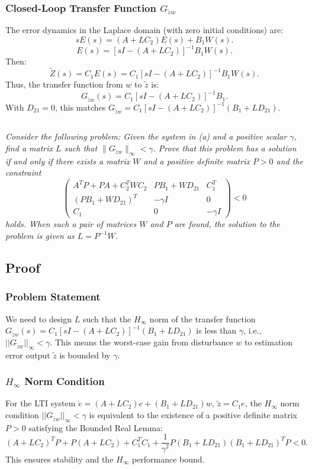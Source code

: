 \documentclass[12pt, letterpaper]{article}
\begin{document}
\subsubsection*{Closed-Loop Transfer Function \( G_{\tilde{z}w} \)}
The error dynamics in the Laplace domain (with zero initial conditions) are:
\[
sE(s) = (A + LC_2)E(s) + B_1W(s).
\]
\[
E(s) = [sI - (A + LC_2)]^{-1}B_1W(s).
\]
Then:
\[
\tilde{Z}(s) = C_1E(s) = C_1[sI - (A + LC_2)]^{-1}B_1W(s).
\]
Thus, the transfer function from \( w \) to \( \tilde{z} \) is:
\[
G_{\tilde{z}w}(s) = C_1[sI - (A + LC_2)]^{-1}B_1.
\]
With \( D_{21} = 0 \), this matches \( G_{\tilde{z}w} = C_1[sI - (A + LC_2)]^{-1}(B_1 + LD_{21}) \).

\subsection{}
\textit{
Consider the following problem: Given the system in (a) and a positive scalar $\gamma$, find a matrix $L$ such that $\|G_{\tilde{z}w}\|_\infty < \gamma$. Prove that this problem has a solution if and only if there exists a matrix $W$ and a positive definite matrix $P > 0$ and the constraint
\[
\begin{pmatrix}
A^TP + PA + C_2^TWC_2 & PB_1 + WD_{21} & C_1^T \\
(PB_1 + WD_{21})^T & -\gamma I & 0 \\
C_1 & 0 & -\gamma I
\end{pmatrix} < 0
\]
holds. When such a pair of matrices $W$ and $P$ are found, the solution to the problem is given as $L = P^{-1}W$.
}

\subsection*{Proof}

\subsubsection*{Problem Statement}
We need to design \( L \) such that the \( H_\infty \) norm of the transfer function \( G_{\tilde{z}w}(s) = C_1[sI - (A + LC_2)]^{-1}(B_1 + LD_{21}) \) is less than \( \gamma \), i.e., \( ||G_{\tilde{z}w}||_\infty < \gamma \). This means the worst-case gain from disturbance \( w \) to estimation error output \( \tilde{z} \) is bounded by \( \gamma \).

\subsubsection*{\( H_\infty \) Norm Condition}
For the LTI system \( \dot{e} = (A + LC_2)e + (B_1 + LD_{21})w \), \( \tilde{z} = C_1e \), the \( H_\infty \) norm condition \( ||G_{\tilde{z}w}||_\infty < \gamma \) is equivalent to the existence of a positive definite matrix \( P > 0 \) satisfying the Bounded Real Lemma:
\[
(A + LC_2)^T P + P(A + LC_2) + C_1^T C_1 + \frac{1}{\gamma^2} P(B_1 + LD_{21})(B_1 + LD_{21})^T P < 0.
\]
This ensures stability and the \( H_\infty \) performance bound.
\end{document}
